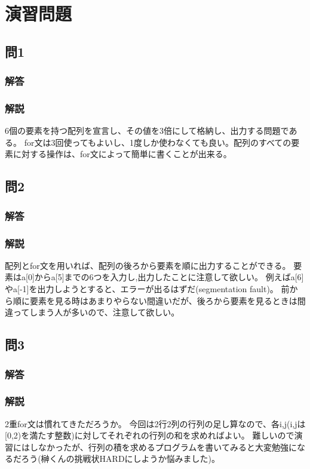 \section{演習問題}
\subsection{問1}
\subsubsection{解答}

\subsubsection{解説}
6個の要素を持つ配列を宣言し、その値を3倍にして格納し、出力する問題である。
for文は3回使ってもよいし、1度しか使わなくても良い。配列のすべての要素に対する操作は、for文によって簡単に書くことが出来る。


\subsection{問2}
\subsubsection{解答}

\subsubsection{解説}
配列とfor文を用いれば、配列の後ろから要素を順に出力することができる。
要素はa[0]からa[5]までの6つを入力し,出力したことに注意して欲しい。
例えばa[6]やa[-1]を出力しようとすると、エラーが出るはずだ(segmentation fault)。
前から順に要素を見る時はあまりやらない間違いだが、後ろから要素を見るときは間違ってしまう人が多いので、注意して欲しい。

\subsection{問3}
\subsubsection{解答}

\subsubsection{解説}
2重for文は慣れてきただろうか。
今回は2行2列の行列の足し算なので、各i,j(i,jは[0,2)を満たす整数)に対してそれぞれの行列の和を求めればよい。
難しいので演習にはしなかったが、行列の積を求めるプログラムを書いてみると大変勉強になるだろう(榊くんの挑戦状HARDにしようか悩みました)。


